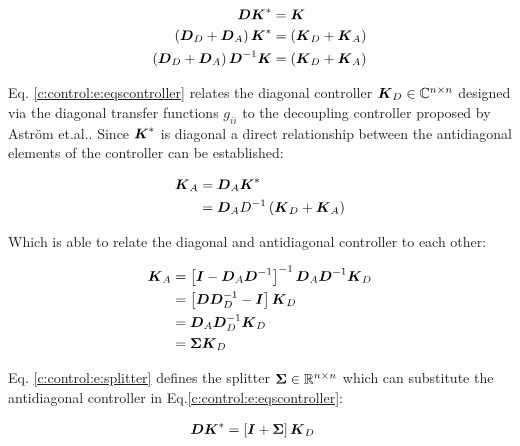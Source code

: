\begin{align}
\begin{split}
\mbox{\boldmath$D$}\mbox{\boldmath$K$}^* &= \mbox{\boldmath$K$} \\
\left(\mbox{\boldmath$D$}_D + \mbox{\boldmath$D$}_A \right) \mbox{\boldmath$K$}^* &= \left(\mbox{\boldmath$K$}_D + \mbox{\boldmath$K$}_A \right)\\
\left(\mbox{\boldmath$D$}_D + \mbox{\boldmath$D$}_A \right) \mbox{\boldmath$D$}^{-1} \mbox{\boldmath$K$} &= \left(\mbox{\boldmath$K$}_D + \mbox{\boldmath$K$}_A \right)
\end{split}
\label{c:control:e:eqscontroller}
\end{align}

Eq. \ref{c:control:e:eqscontroller} relates the diagonal controller $\mbox{\boldmath$K$}_D \in \mathbb{C}^{n \times n}$ designed via the diagonal transfer functions $g_{ii}$  to the decoupling controller proposed by Astr\"om et.al.. Since $\mbox{\boldmath$K$}^{*}$ is diagonal a direct relationship between the antidiagonal elements of the controller can be established:

\begin{align*}
\begin{split}
\mbox{\boldmath$K$}_A &= \mbox{\boldmath$D$}_A \mbox{\boldmath$K$}^* \\
&= \mbox{\boldmath$D$}_A D^{-1} \left( \mbox{\boldmath$K$}_D + \mbox{\boldmath$K$}_A \right) \\
\end{split}
\end{align*}

Which is able to relate the diagonal and antidiagonal controller to each other:

\begin{align}
\begin{split}
\mbox{\boldmath$K$}_A &= \left[ \mbox{\boldmath$I$} - \mbox{\boldmath$D$}_A \mbox{\boldmath$D$}^{-1} \right]^{-1} \mbox{\boldmath$D$}_A \mbox{\boldmath$D$}^{-1} \mbox{\boldmath$K$}_D \\
&= \left[\mbox{\boldmath$D$} \mbox{\boldmath$D$}_D^{-1} - \mbox{\boldmath$I$} \right] \mbox{\boldmath$K$}_D \\
&= \mbox{\boldmath$D$}_A \mbox{\boldmath$D$}_D^{-1} \mbox{\boldmath$K$}_D \\
&= \mbox{\boldmath$\Sigma$} \mbox{\boldmath$K$}_D
\end{split}
\label{c:control:e:splitter}
\end{align}

Eq. \ref{c:control:e:splitter} defines the splitter $\mbox{\boldmath$\Sigma$} \in \mathbb{R}^{n \times n}$ which can substitute the antidiagonal controller in Eq.\ref{c:control:e:eqscontroller}:

\begin{align}
\begin{split}
\mbox{\boldmath$D$} \mbox{\boldmath$K$}^* &= \left[ \mbox{\boldmath$I$} + \mbox{\boldmath$\Sigma$} \right] \mbox{\boldmath$K$}_D
\end{split}
\label{c:control:e:controleqs}
\end{align}

